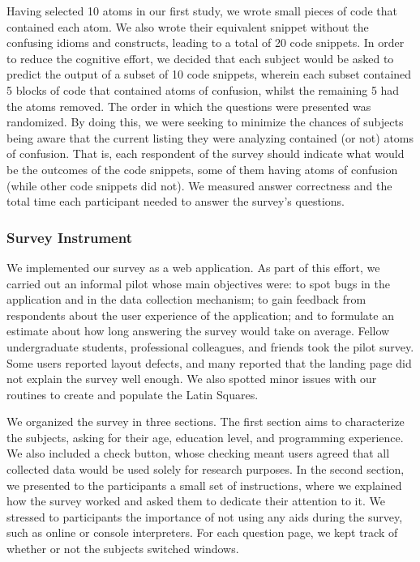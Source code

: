 Having selected 10 atoms in our first study, we wrote small pieces of code that contained each atom. We also wrote their equivalent snippet without the confusing idioms and constructs, leading to a total of 20 code snippets. In order to reduce the cognitive effort, we decided that each subject would be asked to predict the output of a subset of 10 code snippets, wherein each subset contained 5 blocks of code that contained atoms of confusion, whilst the remaining 5 had the atoms removed. The order in which the questions were presented was randomized. By doing this, we were seeking to minimize the chances of subjects being aware that the current listing they were analyzing contained (or not) atoms of confusion.
That is, each respondent of the survey should indicate what would be the outcomes of the code snippets, some of them having atoms of confusion (while other code snippets did not). 
We measured answer correctness and the total time each participant needed to answer the survey's questions.

\subsubsection*{Survey Instrument} 

We implemented our survey as a web application. As part of this 
effort, we carried out an informal pilot whose main objectives were: to spot bugs in the application and in the data collection mechanism; to gain feedback from respondents about the user experience of the application; and to formulate an estimate about how long answering the survey would take on average. Fellow undergraduate students, professional colleagues, and friends took the pilot survey. Some users reported layout defects, and many reported that the landing page did not explain the survey well enough. We also spotted minor issues with our routines to create and populate the Latin Squares. 

We organized the survey in three sections. The first section aims to characterize the subjects, asking for their age, education level, and programming experience. We also included a check button, whose checking meant users agreed that all collected data would be used solely for research purposes. In the second section, we presented to the participants a small set of instructions, where we explained how the survey worked and asked them to dedicate their attention to it. We stressed to participants the importance of not using any aids during the survey, such as online or console interpreters. For each question page, we kept track of whether or not the subjects switched windows. 

